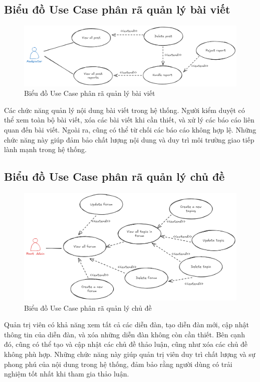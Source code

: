 \documentclass[../index.tex]{subfiles}
\begin{document}
    \subsection{Biểu đồ Use Case phân rã quản lý bài viết}
    \begin{figure}[H]
        \centering
        \includegraphics[width=0.85\linewidth]{
            figures/usecase-post-management.png
        }
        \caption{Biểu đồ Use Case phân rã quản lý bài viết}
    \end{figure}
    Các chức năng quản lý nội dung bài viết trong hệ thống. Người kiểm duyệt có thể
    xem toàn bộ bài viết, xóa các bài viết khi cần thiết, và xử lý các báo cáo liên
    quan đến bài viết. Ngoài ra, cũng có thể từ chối các báo cáo không hợp lệ.
    Những chức năng này giúp đảm bảo chất lượng nội dung và duy trì môi trường
    giao tiếp lành mạnh trong hệ thống.

    \subsection{Biểu đồ Use Case phân rã quản lý chủ đề}
    \begin{figure}[H]
        \centering
        \includegraphics[width=0.85\linewidth]{
            figures/usecase-forum-management.png
        }
        \caption{Biểu đồ Use Case phân rã quản lý chủ đề}
    \end{figure}
    Quản trị viên có khả năng xem tất cả các diễn đàn, tạo diễn đàn mới, cập
    nhật thông tin của diễn đàn, và xóa những diễn đàn không còn cần thiết. Bên
    cạnh đó, cũng có thể tạo và cập nhật các chủ đề thảo luận, cũng như xóa các
    chủ đề không phù hợp. Những chức năng này giúp quản trị viên duy trì chất lượng
    và sự phong phú của nội dung trong hệ thống, đảm bảo rằng người dùng có trải
    nghiệm tốt nhất khi tham gia thảo luận.
\end{document}
